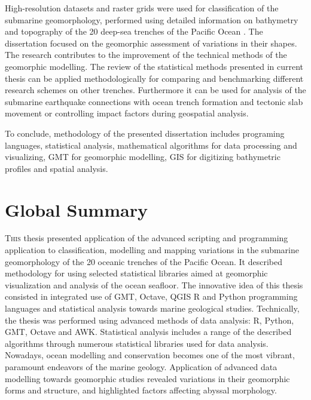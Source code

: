 \documentclass[11pt,a4paper]{report}
\begin{document}
{High-resolution datasets and raster grids were used for classification of the submarine geomorphology, performed using detailed information on bathymetry and topography of the 20 deep-sea trenches of the Pacific Ocean \cite{Lemenkova202115}. The dissertation focused on the geomorphic assessment of variations in their shapes. The research contributes to the improvement of the technical methods of the geomorphic modelling. The review of the statistical methods presented in current thesis can be applied methodologically for comparing and benchmarking different research schemes on other trenches. Furthermore it can be used for analysis of the submarine earthquake connections with ocean trench formation and tectonic slab movement or controlling impact factors during geospatial analysis. 

To conclude, methodology of the presented dissertation includes programing languages, statistical analysis, mathematical algorithms for data processing and visualizing, \ac{GMT} for geomorphic modelling, \ac{GIS} for digitizing bathymetric profiles and spatial analysis. 

\pagebreak
\section{Global Summary}\label{sec:8}
\lettrine[lines=3]{\color{RoyalBlue4}T}{his} thesis presented application of the advanced scripting and programming application to classification, modelling and mapping variations in the submarine geomorphology of the 20 oceanic trenches of the Pacific Ocean. It described methodology for using selected statistical libraries aimed at geomorphic visualization and analysis of the ocean seafloor. The innovative idea of this thesis consisted in integrated use of \ac{GMT}, Octave, QGIS R and Python programming languages and statistical analysis towards marine geological studies. Technically, the thesis was performed using advanced methods of data analysis: R, Python, GMT, Octave and AWK. Statistical analysis includes a range of the described algorithms through numerous statistical libraries used for data analysis. Nowadays, ocean modelling and conservation becomes one of the most vibrant, paramount endeavors of the marine geology.  Application of advanced data modelling towards geomorphic studies revealed variations in their geomorphic forms and structure, and highlighted factors affecting abyssal morphology. 

}
\end{document}
